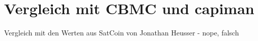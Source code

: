 \chapter{Vergleich mit CBMC und capiman}
\label{chp:comparison}

Vergleich mit den Werten aus SatCoin \cite{jona:1} von Jonathan Heusser - nope, falsch

